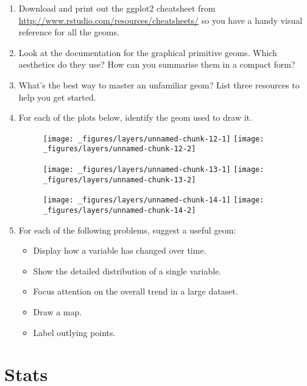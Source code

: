 \begin{enumerate}
\def\labelenumi{\arabic{enumi}.}
\item
  Download and print out the ggplot2 cheatsheet from
  \url{http://www.rstudio.com/resources/cheatsheets/} so you have a
  handy visual reference for all the geoms.
\item
  Look at the documentation for the graphical primitive geoms. Which
  aesthetics do they use? How can you summarise them in a compact form?
\item
  What's the best way to master an unfamiliar geom? List three resources
  to help you get started.
\item
  For each of the plots below, identify the geom used to draw it.

  \begin{figure}[H]
    \texttt{[image: \_figures/layers/unnamed-chunk-12-1]}%
    \texttt{[image: \_figures/layers/unnamed-chunk-12-2]}
  \end{figure}

  \begin{figure}[H]
    \texttt{[image: \_figures/layers/unnamed-chunk-13-1]}%
    \texttt{[image: \_figures/layers/unnamed-chunk-13-2]}
  \end{figure}

  \begin{figure}[H]
    \texttt{[image: \_figures/layers/unnamed-chunk-14-1]}%
    \texttt{[image: \_figures/layers/unnamed-chunk-14-2]}
  \end{figure}
\item
  For each of the following problems, suggest a useful geom:

  \begin{itemize}
  \tightlist
  \item
    Display how a variable has changed over time.
  \item
    Show the detailed distribution of a single variable.
  \item
    Focus attention on the overall trend in a large dataset.
  \item
    Draw a map.
  \item
    Label outlying points.
  \end{itemize}
\end{enumerate}

\hypertarget{sec:stat}{%
\section{Stats}\label{sec:stat}}

